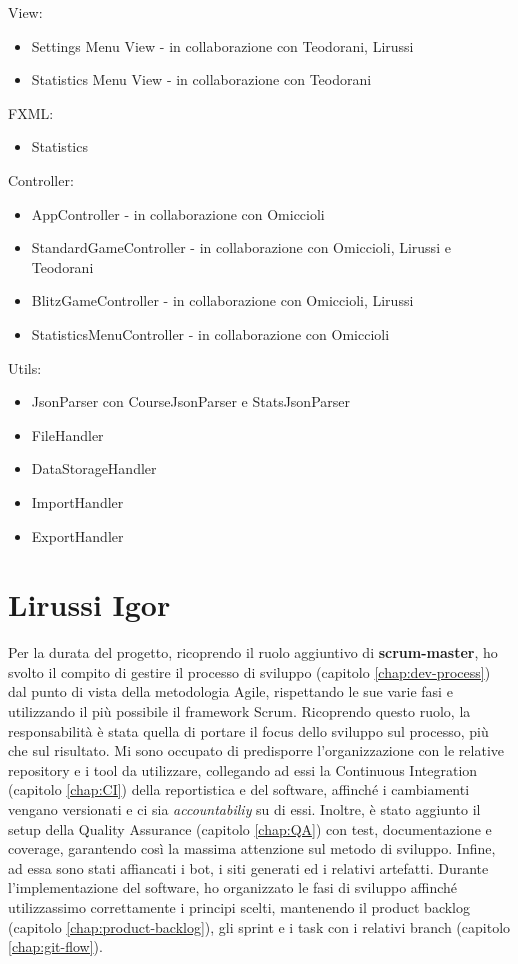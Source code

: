     View:
    \begin{itemize}
        \item Settings Menu View - in collaborazione con Teodorani, Lirussi
        \item Statistics Menu View - in collaborazione con Teodorani
    \end{itemize}
    
    FXML:
    \begin{itemize}
        \item Statistics
    \end{itemize}
    
    Controller:
    \begin{itemize}
        \item AppController - in collaborazione con Omiccioli
        \item StandardGameController - in collaborazione con Omiccioli, Lirussi e Teodorani
        \item BlitzGameController - in collaborazione con Omiccioli, Lirussi
        \item StatisticsMenuController - in collaborazione con Omiccioli
    \end{itemize}

    Utils:
    \begin{itemize}
        \item JsonParser con CourseJsonParser e StatsJsonParser
        \item FileHandler
        \item DataStorageHandler 
        \item ImportHandler
        \item ExportHandler
    \end{itemize}
    
    
\section{Lirussi Igor}
    Per la durata del progetto, ricoprendo il ruolo aggiuntivo di \textbf{scrum-master}, ho svolto il compito di gestire il processo di sviluppo (capitolo \ref{chap:dev-process}) dal punto di vista della metodologia Agile, rispettando le sue varie fasi e utilizzando il più possibile il framework Scrum. Ricoprendo questo ruolo, la responsabilità è stata quella di portare il focus dello sviluppo sul processo, più che sul risultato. Mi sono occupato di predisporre l'organizzazione con le relative repository e i tool da utilizzare, collegando ad essi la Continuous Integration (capitolo \ref{chap:CI}) della reportistica e del software, affinché i cambiamenti vengano versionati e ci sia \textit{accountabiliy} su di essi. Inoltre, è stato aggiunto il setup della Quality Assurance (capitolo \ref{chap:QA}) con test, documentazione e coverage, garantendo così la massima attenzione sul metodo di sviluppo. Infine, ad essa sono stati affiancati i bot, i siti generati ed i relativi artefatti. Durante l'implementazione del software, ho organizzato le fasi di sviluppo affinché utilizzassimo correttamente i principi scelti, mantenendo il product backlog (capitolo \ref{chap:product-backlog}), gli sprint e i task con i relativi branch (capitolo \ref{chap:git-flow}).
    
